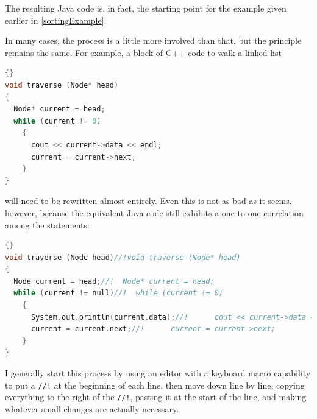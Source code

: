 \documentclass[11pt,titlepage]{book}
\begin{document}
The resulting Java code is, in fact, the starting point for the example 
given earlier in \autoref{sortingExample}.

In many cases, the process is a little more involved than that, but
the principle remains the same.  For example, a block of C++ code to walk 
a linked list
\begin{lstlisting}[language=C++]{}
void traverse (Node* head)
{
  Node* current = head;
  while (current != 0)
    {
      cout << current->data << endl;
      current = current->next;
    }
}
\end{lstlisting}
will need to be rewritten almost entirely. Even this is not as bad as
it seems, however, because the equivalent Java code still exhibits a
one-to-one correlation among the statements:
\begin{lstlisting}[language=C++]{}
void traverse (Node head)//!void traverse (Node* head)
{
  Node current = head;//!  Node* current = head;
  while (current != null)//!  while (current != 0)
    {
      System.out.println(current.data);//!      cout << current->data << endl;
      current = current.next;//!      current = current->next;
    }
}
\end{lstlisting}
I generally start this process by using an editor with a keyboard
macro capability to put a \texttt{//!} at the beginning of each line,
then move down line by line, copying everything to the right of the
\texttt{//!}, pasting it at the start of the line, and making whatever
small changes are actually necessary.





%
\end{document}
